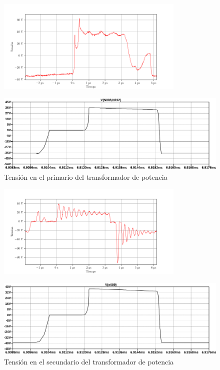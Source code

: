 
\begin{figure}[H]
    \centering
    \includegraphics[width=0.8\textwidth]{images/capturas-osciloscopio/17-11-2022/38.png}
    \caption{}
    \label{fig:osc:38}
\end{figure}

\begin{figure}[H]
    \centering
    \includegraphics[width=\textwidth]{images/sim/19.pdf}
    \caption{Tensión en el primario del transformador de potencia}
    \label{fig:sim:19}
\end{figure}

\begin{figure}[H]
    \centering
    \includegraphics[width=0.8\textwidth]{images/capturas-osciloscopio/17-11-2022/40.png}
    \caption{}
    \label{fig:osc:40}
\end{figure}

\begin{figure}[H]
    \centering
    \includegraphics[width=\textwidth]{images/sim/20.pdf}
    \caption{Tensión en el secundario del transformador de potencia}
    \label{fig:sim:20}
\end{figure}


